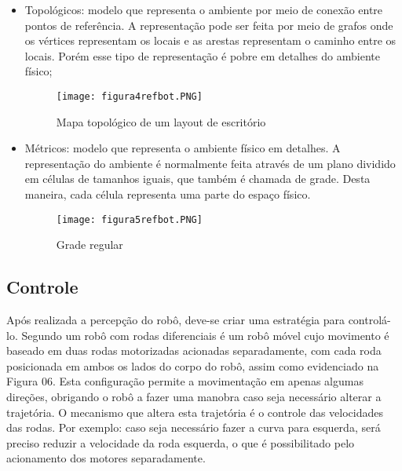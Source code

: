 \begin{itemize}
	\item Topológicos: modelo que representa o ambiente por meio de conexão entre pontos de referência. A representação pode ser feita por meio de grafos onde os vértices representam os locais e as arestas representam o caminho entre os locais. Porém esse tipo de representação é pobre em detalhes do ambiente físico;
	
	\begin{figure}[h!]												
		\centering												
		\texttt{[image: figura4refbot.PNG]}			
		\caption{Mapa topológico de um layout de escritório
		}		
		\label{img:denavit}	
	\end{figure}
	
	\item Métricos: modelo que representa o ambiente físico em detalhes. A representação do ambiente é normalmente feita através de um plano dividido em células de tamanhos iguais, que também é chamada de grade. Desta maneira, cada célula representa uma parte do espaço físico.
	
	\begin{figure}[h!]												
		\centering												
		\texttt{[image: figura5refbot.PNG]}			
		\caption{Grade regular
		}		
		\label{img:denavit}	
	\end{figure}
	
\end{itemize}

\subsection{Controle}\label{sec:control}

Após realizada a percepção do robô, deve-se criar uma estratégia para controlá-lo. Segundo \cite{siegwart} um robô com rodas diferenciais é um robô móvel cujo movimento é baseado em duas rodas motorizadas acionadas separadamente, com cada roda posicionada em ambos os lados do corpo do robô, assim como evidenciado na Figura 06. Esta configuração permite a movimentação em apenas algumas direções, obrigando o robô a fazer uma manobra caso seja necessário alterar a trajetória. O mecanismo que altera esta trajetória é o controle das velocidades das rodas. Por exemplo: caso seja necessário fazer a curva para esquerda, será preciso reduzir a velocidade da roda esquerda, o que é possibilitado pelo acionamento dos motores separadamente. 

